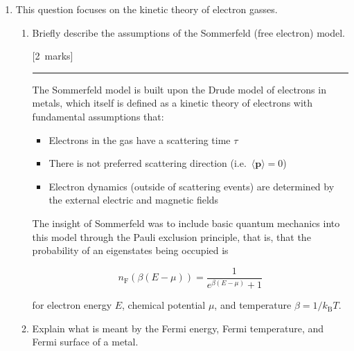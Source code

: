 \documentclass[12pt,a4paper]{article}
\newcommand{\sepline}[0]{\par \hfil\rule{10cm}{0.4pt} \vspace*{\parskip}\hfil}
\begin{document}
	\pagestyle{fancy}
	\lhead{}
	\rhead{}
	\lfoot{}
	\cfoot{}
	\rfoot{}
	\fancyhead[RE,LO]{-\ \thepage \ -}
	 \bigskip


 \bigskip

			\begin{enumerate}


			\item	This question focuses on the kinetic theory of electron gasses.
				\begin{enumerate}
					\item Briefly describe the assumptions of the Sommerfeld (free electron) model.

					\hfill{[2~marks]} %

					\begin{answer}

						\sepline

						The Sommerfeld model is built upon the Drude model of electrons in metals, which itself is defined as a kinetic theory of electrons with fundamental assumptions that:
						\begin{itemize}
							\item Electrons in the gas have a scattering time $\tau$
							\item There is not preferred scattering direction (i.e.~$\langle \mathbf{p} \rangle = 0$)
							\item Electron dynamics (outside of scattering events) are determined by the external electric and magnetic fields
						\end{itemize}
						The insight of Sommerfeld was to include basic quantum mechanics into this model through the Pauli exclusion principle, that is, that the probability of an eigenstates being occupied is

						$$ n_{\mathrm{F}}\left(\beta (E - \mu)\right) = \frac{1}{e^{\beta(E - \mu)}+1} $$

						for electron energy $E$, chemical potential $\mu$, and temperature $\beta = 1/k_\textrm{B} T$.
					\end{answer}

					\item Explain what is meant by the Fermi energy, Fermi temperature, and Fermi surface of a metal.


\end{enumerate}
\end{enumerate}
\end{document}
